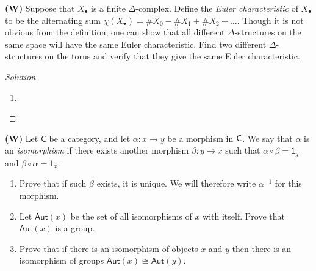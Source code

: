 \newpage



\begin{problem}
\textbf{(W)} Suppose that $X_\bullet$ is a finite $\Delta$-complex. Define the \emph{Euler characteristic} of $X_\bullet$ to be the alternating sum $\chi(X_\bullet) = \# X_0-\#X_1+\#X_2-\ldots$. Though it is not obvious from the definition, one can show that all different $\Delta$-structures on the same space will have the same Euler characteristic. Find two different $\Delta$-structures on the torus and verify that they give the same Euler characteristic.
\end{problem}

\begin{proof}[Solution]
\hfill
\begin{enumerate}[font=\normalfont,label=\textbf{(\alph*)}, wide]
\item
\end{enumerate}
\end{proof}

\newpage


\begin{problem}
\textbf{(W)} Let $\mathsf{C}$ be a category, and let $\alpha: x\to y$ be a morphism in $\mathsf{C}$. We say that $\alpha$ is an \emph{isomorphism} if there exists another morphism $\beta: y \to x$ such that $\alpha \circ \beta = \mathsf{1}_y$ and $\beta \circ  \alpha  = \mathsf{1}_x$.
\begin{enumerate}[font=\normalfont,label=\textbf{(\alph*)}]
\item Prove that if such $\beta$ exists, it is unique. We will therefore write $\alpha^{-1}$ for this morphism. 

\item Let $\mathsf{Aut}(x)$ be the set of all isomorphisms of $x$ with itself. Prove that $\mathsf{Aut}(x)$ is a group.

\item Prove that if there is an isomorphism of objects $x$ and $y$ then there is an isomorphism of groups  $\mathsf{Aut}(x) \cong \mathsf{Aut}(y)$. 
\end{enumerate}
\end{problem}


